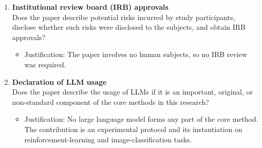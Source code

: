 \begin{enumerate}
\item {\bf Institutional review board (IRB) approvals}\\
Does the paper describe potential risks incurred by study participants, disclose whether such
risks were disclosed to the subjects, and obtain IRB approvals?
\answerNA{}
\begin{itemize}
\item[] Justification: The paper involves no human subjects, so no IRB review was required.
\end{itemize}

\item {\bf Declaration of LLM usage}\\
Does the paper describe the usage of LLMs if it is an important, original, or non-standard
component of the core methods in this research?
\answerNA{}
\begin{itemize}
\item[] Justification: No large language model forms any part of the core method. The
  contribution is an experimental protocol and its instantiation on reinforcement-learning and
  image-classification tasks.
\end{itemize}

\end{enumerate}
